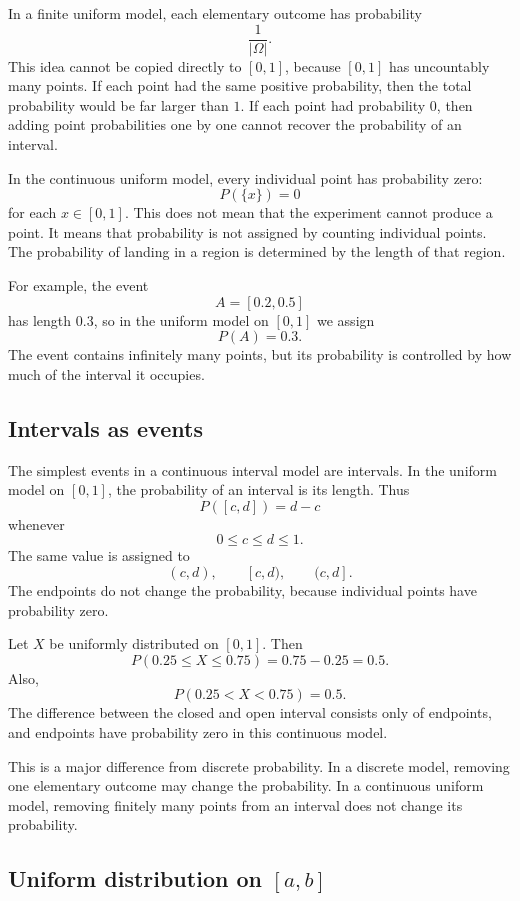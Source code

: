 In a finite uniform model, each elementary outcome has probability
\[
\frac1{|\Omega|}.
\]
This idea cannot be copied directly to \([0,1]\), because \([0,1]\) has
uncountably many points. If each point had the same positive probability, then
the total probability would be far larger than \(1\). If each point had
probability \(0\), then adding point probabilities one by one cannot recover the
probability of an interval.

In the continuous uniform model, every individual point has probability zero:
\[
P(\{x\})=0
\]
for each \(x\in[0,1]\). This does not mean that the experiment cannot produce a
point. It means that probability is not assigned by counting individual points.
The probability of landing in a region is determined by the length of that
region.

For example, the event
\[
A=[0.2,0.5]
\]
has length \(0.3\), so in the uniform model on \([0,1]\) we assign
\[
P(A)=0.3.
\]
The event contains infinitely many points, but its probability is controlled by
how much of the interval it occupies.

\subsection*{Intervals as events}

The simplest events in a continuous interval model are intervals. In the uniform
model on \([0,1]\), the probability of an interval is its length. Thus
\[
P([c,d])=d-c
\]
whenever
\[
0\leq c\leq d\leq 1.
\]
The same value is assigned to
\[
(c,d),\qquad [c,d),\qquad (c,d].
\]
The endpoints do not change the probability, because individual points have
probability zero.

\begin{examplebox}
Let \(X\) be uniformly distributed on \([0,1]\). Then
\[
P(0.25\leq X\leq 0.75)=0.75-0.25=0.5.
\]
Also,
\[
P(0.25<X<0.75)=0.5.
\]
The difference between the closed and open interval consists only of endpoints,
and endpoints have probability zero in this continuous model.
\end{examplebox}

This is a major difference from discrete probability. In a discrete model,
removing one elementary outcome may change the probability. In a continuous
uniform model, removing finitely many points from an interval does not change
its probability.

\subsection*{Uniform distribution on \([a,b]\)}

